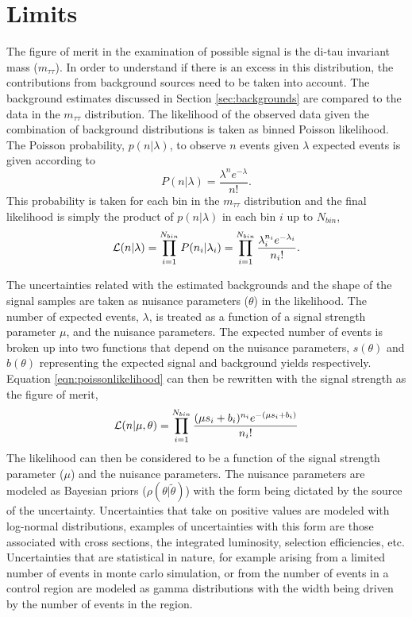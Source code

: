 \section{Limits}
\label{sec:limits}
The figure of merit in the examination of possible signal is the di-tau invariant mass ($m_{\tau\tau}$). 
In order to understand if there is an excess in this distribution, the contributions from background sources need to be taken into account.
The background estimates discussed in Section \ref{sec:backgrounds} are compared to the data in the $m_{\tau\tau}$ distribution.
The likelihood of the observed data given the combination of background distributions is taken as binned Poisson likelihood.
The Poisson probability, $p(n|\lambda)$, to observe $n$ events given $\lambda$ expected events is given according to
\begin{equation}
P(n|\lambda) = \frac{\lambda^{n}e^{-\lambda}}{n!}.
\end{equation}
This probability is taken for each bin in the $m_{\tau\tau}$ distribution and the final likelihood is simply the product of $p(n|\lambda)$ in each bin $i$ up to $N_{bin}$,
\begin{equation}
\label{eqn:poissonlikelihood}
\mathcal{L}(n|\lambda) = \prod_{i=1}^{N_{bin}}P(n_{i}|\lambda_{i}) = \prod_{i=1}^{N_{bin}} \frac{\lambda_{i}^{n_{i}}e^{-\lambda_{i}}}{n_{i}!}.
\end{equation}

The uncertainties related with the estimated backgrounds and the shape of the signal samples are taken as nuisance parameters ($\theta$) in the likelihood.
The number of expected events, $\lambda$, is treated as a function of a signal strength parameter $\mu$, and the nuisance parameters.
The expected number of events is broken up into two functions that depend on the nuisance parameters, $s(\theta)$ and $b(\theta)$ representing the expected signal and background yields respectively.
Equation \ref{eqn:poissonlikelihood} can then be rewritten with the signal strength as the figure of merit,
\begin{equation}
\mathcal{L}(n|\mu, \theta) = \prod_{i=1}^{N_{bin}} \frac{(\mu s_{i} + b_{i})^{n_{i}}e^{-(\mu s_{i}+b_{i})}}{n_{i}!}
\end{equation}
The likelihood can then be considered to be a function of the signal strength parameter ($\mu$) and the nuisance parameters.
The nuisance parameters are modeled as Bayesian priors ($\rho (\theta|\tilde{\theta})$) with the form being dictated by the source of the uncertainty.
Uncertainties that take on positive values are modeled with log-normal distributions, examples of uncertainties with this form are those associated with cross sections, the integrated luminosity, selection efficiencies, etc.
Uncertainties that are statistical in nature, for example arising from a limited number of events in monte carlo simulation, or from the number of events in a control region are modeled as gamma distributions with the width being driven by the number of events in the region.


